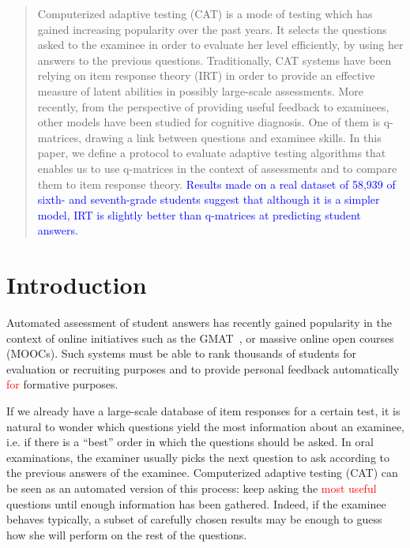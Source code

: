 \documentclass{sig-alternate}
\newcommand\alert[1]{\textcolor{red}{#1}}
\newcommand\note[1]{\textcolor{blue}{#1}}
\begin{document}
\maketitle
\begin{abstract}
Computerized adaptive testing (CAT) is a mode of testing which has gained increasing popularity over the past years. It selects the questions asked to the examinee in order to evaluate her level efficiently, by using her answers to the previous questions.
Traditionally, CAT systems have been relying on item response theory (IRT) in order to provide an effective measure of latent abilities in possibly large-scale assessments.
More recently, from the perspective of providing useful feedback to examinees, other models have been studied for cognitive diagnosis. One of them is q-matrices, drawing a link between questions and examinee skills.
In this paper, we define a protocol to evaluate adaptive testing algorithms that enables us to use q-matrices in the context of assessments and to compare them to item response theory.
\note{Results made on a real dataset of 58,939 of sixth- and seventh-grade students suggest that although it is a simpler model, IRT is slightly better than q-matrices at predicting student answers.}
\end{abstract}




\newpage

\section{Introduction}
Automated assessment of student answers has recently gained popularity in the context of online initiatives such as the GMAT~\cite{Rudner2010}, or massive online open courses (MOOCs). Such systems must be able to rank thousands of students for evaluation or recruiting purposes and to provide personal feedback automatically \alert{for} formative purposes.

If we already have a large-scale database of item responses for a certain test, it is natural to wonder which questions yield the most information about an examinee, i.e. if there is a ``best'' order in which the questions should be asked. In oral examinations, the examiner usually picks the next question to ask according to the previous answers of the examinee. Computerized adaptive testing (CAT) can be seen as an automated version of this process: keep asking the \alert{most useful} questions until enough information has been gathered. Indeed, if the examinee behaves typically, a subset of carefully chosen results may be enough to guess how she will perform on the rest of the questions.
\end{document}
